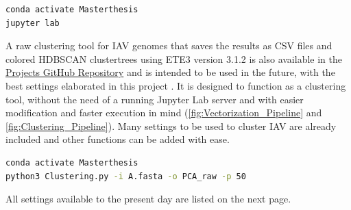 \begin{lstlisting}[language=sh]
conda activate Masterthesis
jupyter lab
\end{lstlisting}  

A raw clustering tool for \gls{IAV} genomes that saves the results as CSV files and colored \gls{HDBSCAN} clustertrees using ETE3 version 3.1.2 is also available in the \href{https://github.com/ahenoch/Masterthesis.git}{Projects GitHub Repository} and is intended to be used in the future, with the best settings elaborated in this project \autocite{huerta-cepas_ete_2016}. It is designed to function as a clustering tool, without the need of a running Jupyter Lab server and with easier modification and faster execution in mind (\autoref{fig:Vectorization_Pipeline} and \autoref{fig:Clustering_Pipeline}). Many settings to be used to cluster \gls{IAV} are already included and other functions can be added with ease.

\begin{lstlisting}[language=sh]
conda activate Masterthesis
python3 Clustering.py -i A.fasta -o PCA_raw -p 50
\end{lstlisting}  

All settings available to the present day are listed on the next page.

